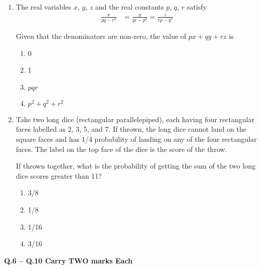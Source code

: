 \documentclass[journal,11pt,onecolumn]{IEEEtran}
\begin{document}
\begin{enumerate}
    \item The real variables $x$, $y$, $z$ and the real constants $p$, $q$, $r$ satisfy
          \begin{align}
              \frac{x}{pq-r^2} & = \frac{y}{qr-p^2} = \frac{z}{rp-q^2}
          \end{align}

          Given that the denominators are non-zero, the value of $px + qy + rz$ is

          \begin{enumerate}
              \item 0
              \item 1
              \item $pqr$
              \item $p^2 + q^2 + r^2$
          \end{enumerate}

    \item Take two long dice (rectangular parallelepiped), each having four rectangular faces labelled as 2, 3, 5, and 7. If thrown, the long dice cannot land on the square faces and has 1/4 probability of landing on any of the four rectangular faces. The label on the top face of the dice is the score of the throw.

          If thrown together, what is the probability of getting the sum of the two long dice scores greater than 11?

          \begin{enumerate}
              \item 3/8
              \item 1/8
              \item 1/16
              \item 3/16
          \end{enumerate}

\end{enumerate}

\large\textbf{Q.6 – Q.10 Carry TWO marks Each}\\
\end{document}
